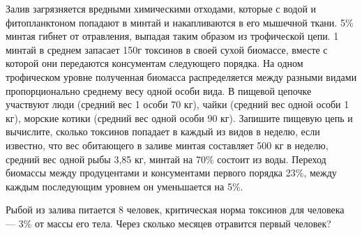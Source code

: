 
Залив загрязняется вредными химическими отходами, которые с водой и фитопланктоном попадают в минтай и 
накапливаются в его мышечной ткани. 5\% минтая гибнет от отравления, выпадая таким образом из трофической цепи. 
1 минтай в среднем запасает 150г токсинов в своей сухой биомассе, вместе с которой они передаются консументам 
следующего порядка. На одном трофическом уровне полученная биомасса распределяется между разными видами 
пропорционально среднему весу одной особи вида. В пищевой цепочке участвуют люди (средний вес 1 особи 70 кг), 
чайки (средний вес одной особи 1 кг), морские котики (средний вес одной особи 90 кг). Запишите пищевую цепь и 
вычислите, сколько токсинов попадает в каждый из видов в неделю, если известно, что вес обитающего в заливе минтая 
составляет 500 кг в неделю, средний вес одной рыбы 3,85 кг, минтай на 70\% состоит из воды. Переход биомассы между 
продуцентами и консументами первого порядка 23\%, между каждым последующим уровнем он уменьшается на 5\%.

Рыбой из залива питается 8 человек, критическая норма токсинов для человека — 3\% от массы его тела. Через 
сколько месяцев отравится первый человек?
